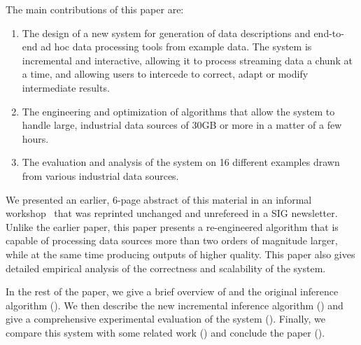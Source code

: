 The main contributions of this paper are:
\begin{enumerate}
\item The design of a new system for generation of data descriptions
and end-to-end ad hoc data processing tools from example data.  
The system is incremental and interactive, allowing it to process
streaming data a chunk at a time, and allowing users to intercede
to correct, adapt or modify intermediate results. 
\item The engineering and optimization of algorithms that allow
the system to handle large, industrial data sources of 30GB or
more in a matter of a few hours.
\item The evaluation and analysis of the system
on 16 different examples drawn from
various industrial data sources.
\end{enumerate}

We presented an earlier, 6-page abstract of this material in an informal workshop~\cite{wasl09:zhu+}
that was reprinted unchanged and unrefereed in a SIG newsletter. 
Unlike the earlier paper, this paper presents a re-engineered algorithm
that is capable of processing data sources more than two orders of magnitude
larger, while at the same time producing outputs of higher quality. 
This paper also gives detailed empirical analysis of the 
correctness and scalability of the system.

In the rest of the paper, we give a brief overview of \pads{} and the original
\learnpads{} inference algorithm (). We then describe
the new incremental inference algorithm ()
and give a comprehensive experimental
evaluation of the system (). Finally, we compare this
system with some related work () and conclude
the paper ().
